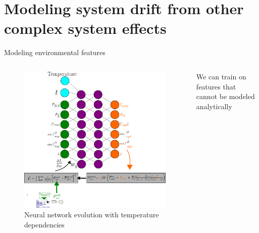 \documentclass[aspectratio=169]{beamer}
\begin{document}
\section{Modeling system drift from other complex system effects}

\begin{frame}{\small{Modeling environmental features}}
	\begin{columns}[c]
		\begin{column}{0.55\textwidth}
			\begin{figure}
				\centering
				\includegraphics[width=\textwidth]{images/nn_time_tpm.pdf}
				\caption{\tiny Neural network evolution with temperature dependencies}
			\end{figure}
		\end{column}
		\begin{column}{0.45\textwidth}
			\begin{tcolorbox}[colback=blue!5!white,colframe=blue!75!black,title=]
				We can train on features that cannot be modeled analytically
			\end{tcolorbox}
		\end{column}
	\end{columns}
\end{frame}
\end{document}
